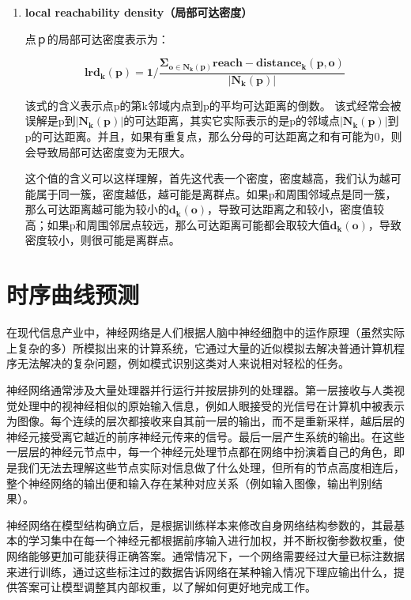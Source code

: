 \documentclass[a4paper,AutoFakeBold,oneside,12pt]{book}
\begin{document}
\begin{enumerate}

	\item \textbf{ local reachability density（局部可达密度）}

	点ｐ的局部可达密度表示为：

	\begin{equation}
	\bm{lrd_k(p)}=\bm{1}/\frac{\bm{\Sigma_{o\in N_k(p)} reach-distance_k(p,o)}}{\bm{|N_k(p)|}}
	\end{equation}

	该式的含义表示点p的第k邻域内点到p的平均可达距离的倒数。 该式经常会被误解是p到$\bm{|N_k(p)|}$的可达距离，其实它实际表示的是p的邻域点$\bm{|N_k(p)|}$到p的可达距离。并且，如果有重复点，那么分母的可达距离之和有可能为0，则会导致局部可达密度变为无限大。

	这个值的含义可以这样理解，首先这代表一个密度，密度越高，我们认为越可能属于同一簇，密度越低，越可能是离群点。如果p和周围邻域点是同一簇，那么可达距离越可能为较小的$\bm{d_k(o)}$，导致可达距离之和较小，密度值较高；如果p和周围邻居点较远，那么可达距离可能都会取较大值$\bm{d_k(o)}$，导致密度较小，则很可能是离群点。 
	\end{enumerate}
	
\section{时序曲线预测}
	在现代信息产业中，神经网络是人们根据人脑中神经细胞中的运作原理（虽然实际上复杂的多）所模拟出来的计算系统，它通过大量的近似模拟去解决普通计算机程序无法解决的复杂问题，例如模式识别这类对人来说相对轻松的任务。

	神经网络通常涉及大量处理器并行运行并按层排列的处理器。第一层接收与人类视觉处理中的视神经相似的原始输入信息，例如人眼接受的光信号在计算机中被表示为图像。每个连续的层次都接收来自其前一层的输出，而不是重新采样，越后层的神经元接受离它越近的前序神经元传来的信号。最后一层产生系统的输出。在这些一层层的神经元节点中，每一个神经元处理节点都在网络中扮演着自己的角色，即是我们无法去理解这些节点实际对信息做了什么处理，但所有的节点高度相连后，整个神经网络的输出便和输入存在某种对应关系（例如输入图像，输出判别结果）。

	神经网络在模型结构确立后，是根据训练样本来修改自身网络结构参数的，其最基本的学习集中在每一个神经元都根据前序输入进行加权，并不断权衡参数权重，使网络能够更加可能获得正确答案。通常情况下，一个网络需要经过大量已标注数据来进行训练，通过这些标注过的数据告诉网络在某种输入情况下理应输出什么，提供答案可让模型调整其内部权重，以了解如何更好地完成工作。
\end{document}
